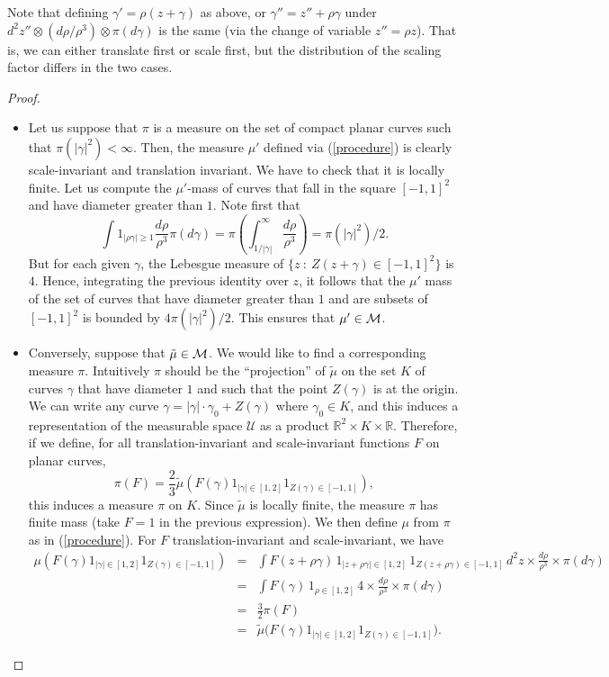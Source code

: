 \documentclass[11pt]{article}
\newcommand{\R}{{{\mathbb {R}}}}
\begin{document}
Note that defining $\gamma'= \rho (z +  \gamma)$ as above, 
or $\gamma''=  z'' +\rho  \gamma$ under 
$d^2 z'' \otimes (d \rho / \rho^3) \otimes \pi (d \gamma)$ is the same 
(via the change of variable $z''=\rho z$). 
That is, we can either translate first or scale first, but the distribution
of the scaling factor differs in the two cases.

\begin {proof}
\null
\begin {itemize}
\item
Let us suppose that $\pi$ is a measure on the set of compact planar curves 
such that $\pi ( |\gamma|^2 ) < \infty$.
Then, the measure $\mu'$ defined via (\ref {procedure}) is clearly 
scale-invariant and translation invariant. We have to check that it is locally finite. 
Let us compute the $\mu'$-mass of curves that fall in the square 
$[-1,1]^2$ and have diameter greater than $1$.
Note first that
 $$\int 1_ {|\rho \gamma | \ge 1 } \frac {d \rho}{ \rho^3 }  \pi (d \gamma) 
 = \pi \left( \int_{1/|\gamma|}^{\infty} \frac {d \rho}{  \rho^3 } \right) 
 =  \pi ( |\gamma|^2 ) / 2.$$ 
But for each given $\gamma$, the Lebesgue measure of $\{z \ : \ Z( z + \gamma) \in [-1, 1]^2 \}$  
is $4$. Hence, integrating the previous identity 
over $z$, it follows that the $\mu'$ mass of the set of curves that have
diameter greater than $1$ and are subsets of $[-1,1]^2$ is bounded by 
$4 \pi ( |\gamma|^2) / 2$. This ensures that $\mu' \in {\cal M}$. 

\item
Conversely, suppose that $\tilde \mu \in {\cal M}$. 
We would like to find a corresponding measure $\pi$.
Intuitively $\pi$ should be the ``projection'' of $\tilde \mu$
on the set $K$ of curves $\gamma$ that have diameter $1$ and such that the point  
$Z (\gamma)$  is at the origin.
We can write any curve $\gamma = |\gamma| \cdot \gamma_0 + Z(\gamma)$
where $\gamma_0 \in K$, and this induces a representation of the measurable
space ${\mathcal U}$ as a product ${\R}^2 \times K \times {\R}$.
Therefore, if we define, for all translation-invariant and scale-invariant functions $F$
on planar curves,
$$ \pi ( F) = \frac {2}{3} 
\tilde \mu ( F ( \gamma ) 1_{| \gamma | \in [1,2] } 1_{ Z ( \gamma) \in [-1,1]}), $$
this induces a measure $\pi$ on $K$.
 Since $\tilde \mu$ is locally finite, the measure $\pi$ has finite mass 
(take $F=1$ in the previous expression). 
 We then define $\mu$ from $\pi$ as in (\ref {procedure}).  
For $F$ translation-invariant and scale-invariant, we have
\begin{eqnarray*}
\mu ( F ( \gamma ) 1_{| \gamma | \in [1,2] } 1_{ Z ( \gamma) \in [-1,1]})
& = &
\int F ( z+\rho\gamma ) \, 1_{| z+\rho\gamma | \in [1,2] } \, 1_{ Z ( z+\rho\gamma) \in [-1,1]}
\, d^2 z \times \frac {d\rho}{ \rho^3} \times \pi(d\gamma) \\
& = &
\int F (\gamma ) \, 1_{\rho \in [1,2] } \, 4
\times \frac {d\rho}{\rho^3} \times \pi(d\gamma) \\
& = &
\frac 3 2 \pi(F) \\
& = &
 \tilde \mu \bigl( F ( \gamma ) 1_{| \gamma | \in [1,2] } 1_{ Z ( \gamma) \in [-1,1]}\bigr) .
 \end{eqnarray*}


\end{itemize}
\end{proof}
\end{document}
